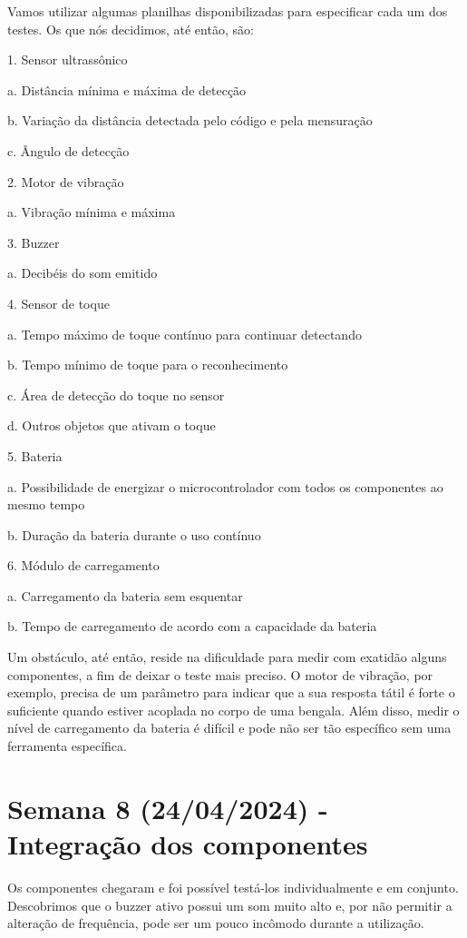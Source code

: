 Vamos utilizar algumas planilhas disponibilizadas para especificar cada um dos testes. Os que nós decidimos, até então, são:

1.  Sensor ultrassônico

    a. Distância mínima e máxima de detecção

    b. Variação da distância detectada pelo código e pela mensuração

    c. Ângulo de detecção

2. Motor de vibração

    a. Vibração mínima e máxima

3. Buzzer

    a. Decibéis do som emitido

4.  Sensor de toque

    a. Tempo máximo de toque contínuo para continuar detectando

    b. Tempo mínimo de toque para o reconhecimento

    c. Área de detecção do toque no sensor

    d. Outros objetos que ativam o toque

5. Bateria

    a. Possibilidade de energizar o microcontrolador com todos os componentes ao mesmo tempo

    b. Duração da bateria durante o uso contínuo

6.  Módulo de carregamento

    a. Carregamento da bateria sem esquentar

    b. Tempo de carregamento de acordo com a capacidade da bateria


Um obstáculo, até então, reside na dificuldade para medir com exatidão alguns componentes, a fim de deixar o teste mais preciso. O motor de vibração, por exemplo, precisa de um parâmetro para indicar que a sua resposta tátil é forte o suficiente quando estiver acoplada no corpo de uma bengala. Além disso, medir o nível de carregamento da bateria é difícil e pode não ser tão específico sem uma ferramenta específica.

\section{Semana 8 (24/04/2024) - Integração dos componentes }
Os componentes chegaram e foi possível testá-los individualmente e em conjunto. Descobrimos que o buzzer ativo possui um som muito alto e, por não permitir a alteração de frequência, pode ser um pouco incômodo durante a utilização. 

